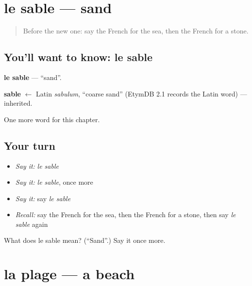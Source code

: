 \section[le sable]{le sable — sand}

\label{lesson:FR-C82-sable}



\begin{quote}
Before the new one: say the French for the sea, then the French for a stone.
\end{quote}

\subsection*{You'll want to know: le sable}
\textbf{le sable} — \textquotedblleft{}sand\textquotedblright{}.

\begin{cousinweb}
\textbf{sable} $\leftarrow$ Latin \emph{sabulum}, \textquotedblleft{}coarse sand\textquotedblright{} (EtymDB 2.1 records the Latin word) — inherited.
\end{cousinweb}

\begin{grammarlens}[title={What you've built}]
One more word for this chapter.
\end{grammarlens}

\subsection*{Your turn}
\begin{itemize}
\raggedright
  \item \emph{Say it:} \emph{le sable}
  \item \emph{Say it:} \emph{le sable}, once more
  \item \emph{Say it:} say \emph{le sable}
  \item \emph{Recall:} say the French for the sea, then the French for a stone, then say \emph{le sable} again
\end{itemize}

\begin{tcolorbox}[breakable,colback=teal!4,colframe=teal!35!black,title={Before you move on}]
What does le sable mean? (\textquotedblleft{}Sand\textquotedblright{}.) Say it once more.
\end{tcolorbox}
\section[la plage]{la plage — a beach}

